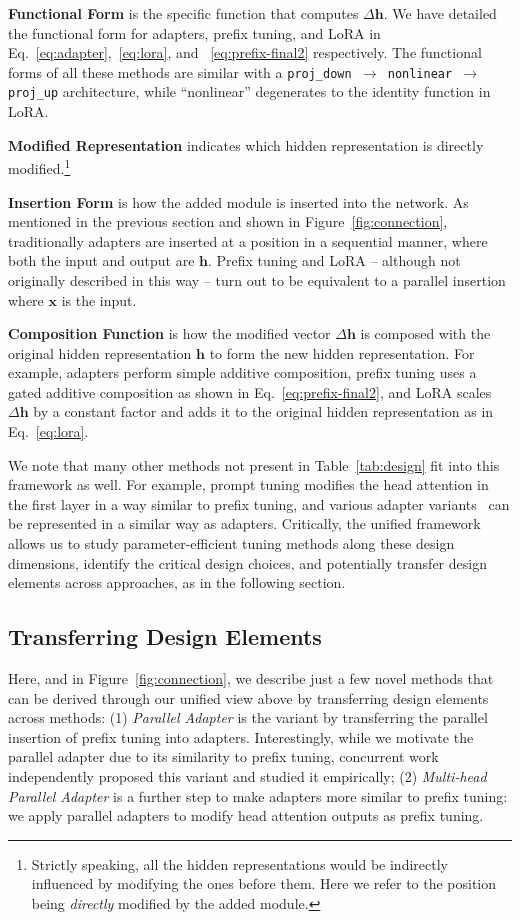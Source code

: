  \textbf{Functional Form} is the specific function that computes $\Delta {\bm{h}}$. We have detailed the functional form for adapters, prefix tuning, and LoRA in Eq.~\ref{eq:adapter},~\ref{eq:lora}, and ~\ref{eq:prefix-final2} respectively. The functional forms of all these methods are similar with a \texttt{proj\_down $\rightarrow$ nonlinear $\rightarrow$ proj\_up} architecture, while ``nonlinear'' degenerates to the identity function in LoRA. 

 \textbf{Modified Representation} indicates which hidden representation is directly modified.\footnote{Strictly speaking, all the hidden representations would be indirectly influenced by modifying the ones before them. Here we refer to the position being \emph{directly} modified by the added module.}

 \textbf{Insertion Form} is how the added module is inserted into the network. As mentioned in the previous section and shown in Figure~\ref{fig:connection}, traditionally adapters are inserted at a position in a sequential manner, where both the input and output are ${\bm{h}}$. Prefix tuning and LoRA -- although not originally described in this way -- turn out to be equivalent to a parallel insertion where ${\bm{x}}$ is the input. 

 \textbf{Composition Function} is how the modified vector $\Delta {\bm{h}}$ is composed with the original hidden representation ${\bm{h}}$ to form the new hidden representation. For example, adapters perform simple additive composition, prefix tuning uses a gated additive composition as shown in Eq.~\ref{eq:prefix-final2}, and LoRA scales $\Delta {\bm{h}}$ by a constant factor and adds it to the original hidden representation as in Eq.~\ref{eq:lora}. 

We note that many other methods not present in Table~\ref{tab:design} fit into this framework as well. For example, prompt tuning modifies the head attention in the first layer in a way similar to prefix tuning, and various adapter variants~\citep{pfeiffer2021adapterfusion,mahabadi2021compacter} can be represented in a similar way as adapters. Critically, the unified framework allows us to study parameter-efficient tuning methods along these design dimensions, identify the critical design choices, and potentially transfer design elements across approaches, as in the following section. 

\subsection{Transferring Design Elements}
\label{sec:transfer}
Here, and in Figure~\ref{fig:connection}, we describe just a few novel methods that can be derived through our unified view above by transferring design elements across methods: (1) \emph{Parallel Adapter} is the variant by transferring the parallel insertion of prefix tuning into adapters. Interestingly, while we motivate the parallel adapter due to its similarity to prefix tuning, concurrent work~\citep{zhu2021serial} independently proposed this variant and studied it empirically; (2) \emph{Multi-head Parallel Adapter} is a further step to make adapters more similar to prefix tuning: we apply parallel adapters to modify head attention outputs as prefix tuning. 

